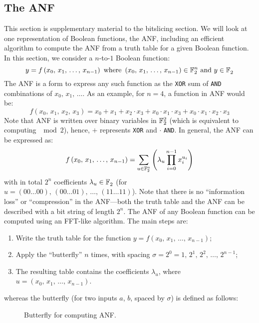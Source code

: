 \subsection{The \acl{ANF}}
\label{chap:symmetric_crypto:anf}
This section is supplementary material to the bitslicing section. We will look at one representation of Boolean functions, the \acl{ANF}, including an efficient algorithm to compute the \ac{ANF} from a truth table for a given Boolean function. In this section, we consider a $n$-to-$1$ Boolean function:
$$
y = f\left(x_0,\,x_1,\,\ldots,\, x_{n-1}\right)\ \textrm{where}\ \left(x_0,\,x_1,\,\ldots,\,x_{n-1}\right) \in \binfield{n}\ \textrm{and}\ y \in \binfield{}
$$
The \ac{ANF} is a form to express any such function as the \verb+XOR+ sum of \verb+AND+ combinations of $x_0,\,x_1,\, \ldots$. As an example, for $n = 4$, a function in \ac{ANF} would be:
$$
f\left(x_0,\,x_1,\,x_2,\,x_3\right) = x_0 + x_1 + x_2 \cdot x_3 + x_0 \cdot x_1 \cdot x_3 + x_0 \cdot x_1 \cdot x_2 \cdot x_3
$$
Note that \ac{ANF} is written over binary variables in $\mathbb{F}_2^{2}$ (which is equivalent to computing $\mod 2$), hence, $+$ represents \verb+XOR+ and $\cdot$ \verb+AND+. In general, the \ac{ANF} can be expressed as:
$$
f\left(x_0,\,x_1,\,\ldots,\, x_{n-1}\right) = \sum_{u \in \mathbb{F}_2^{n}}{\left(\lambda_u \prod_{i = 0}^{n-1}{x_i^{u_i}} \right)} 
$$
with in total $2^n$ coefficients $\lambda_u \in \mathbb{F}_2^{}$ (for $u = \left(00\ldots00\right),\,\left(00\ldots01\right),\,\ldots,\,\left(11\ldots11\right)$). Note that there is no ``information loss'' or ``compression'' in the \ac{ANF}---both the truth table and the \ac{ANF} can be described with a bit string of length $2^n$.
%
The \ac{ANF} of any Boolean function can be computed using an \ac{FFT}-like algorithm. The main steps are:

\begin{enumerate}[itemsep=-1pt]
	\item Write the truth table for the function $y = f\left(x_0,\,x_1,\,\ldots,\, x_{n-1}\right)$;
	\item Apply the ``butterfly'' $n$ times, with spacing $\sigma = 2^0 = 1,\,2^1,\,2^2,\,\ldots,\,2^{n-1}$;
	\item The resulting table contains the coefficients $\lambda_u$, where $u = \left(x_0,\,x_1,\,\ldots,\, x_{n-1}\right)$.
\end{enumerate}

whereas the butterfly (for two inputs $a$, $b$, spaced by $\sigma$) is defined as follows:

\begin{figure}[h!tb]
		\center
		
		\caption{Butterfly for computing \ac{ANF}.}
		\label{fig:symmetric_crypto:butterfly}
\end{figure} 

